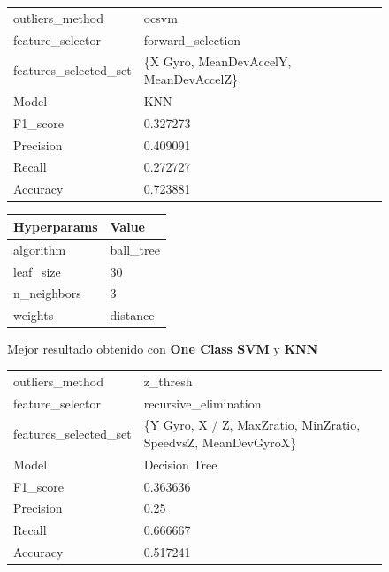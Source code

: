 \begin{appendices}
		\begin{figure}[htb]
			\centering
			\begin{tabular}{ll}
				\toprule
					  outliers\_method &                                  ocsvm \\
					 feature\_selector &                      forward\_selection \\
				features\_selected\_set & \{X Gyro, MeanDevAccelY, MeanDevAccelZ\} \\
								Model &                                    KNN \\
						F1\_score &                               0.327273 \\
					   Precision &                               0.409091 \\
						  Recall &                               0.272727 \\
						Accuracy &                               0.723881 \\
				\bottomrule
			\end{tabular}
			\newline
			\newline

			\begin{tabular}{ll}
				\toprule
				Hyperparams &     Value \\
				\midrule
				  algorithm & ball\_tree \\
				  leaf\_size &        30 \\
				n\_neighbors &         3 \\
					weights &  distance \\
				\bottomrule
			\end{tabular}
			\caption{Mejor resultado obtenido con \textbf{One Class SVM} y \textbf{KNN}}
			\label{table:20}
		\end{figure}

		\begin{figure}[htb]
			\centering
			\begin{tabular}{ll}
				\toprule
					  outliers\_method &                                           z\_thresh \\
					 feature\_selector &                              recursive\_elimination \\
					 features\_selected\_set & \{Y Gyro, X / Z, MaxZratio, MinZratio, SpeedvsZ, MeanDevGyroX\} \\
								Model &                                      Decision Tree \\
						F1\_score &                                           0.363636 \\
					   Precision &                                               0.25 \\
						  Recall &                                           0.666667 \\
						Accuracy &                                           0.517241 \\
				\bottomrule
			\end{tabular}
			\newline
			\newline


\end{figure}
\end{appendices}
